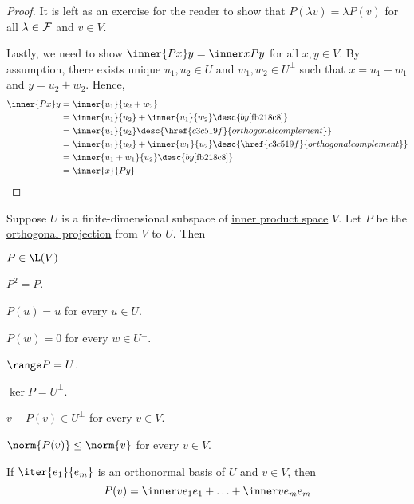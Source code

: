 \begin{proof}
  It is left as an exercise for the reader to show that $P(\lambda v)=\lambda
  P(v)$ for all $\lambda\in\mathcal F$ and $v\in V$.

  Lastly, we need to show $\inner{Px}y=\inner x{Py}$ for all $x,y\in V$. By
  assumption, there exists unique $u_1,u_2\in U$ and $w_1,w_2\in U^\perp$ such
  that $x=u_1+w_1$ and $y=u_2+w_2$. Hence,
  \begin{align*}
    \inner{Px}y &=\inner{u_1}{u_2+w_2}                                                          \\
                &=\inner{u_1}{u_2}+\inner{u_1}{w_2}\desc{by \autoref{fb218c8}}                  \\
                &=\inner{u_1}{u_2}\desc{\href{c3c519f}{orthogonal complement}}                  \\
                &=\inner{u_1}{u_2}+\inner{w_1}{u_2}\desc{\href{c3c519f}{orthogonal complement}} \\
                &=\inner{u_1+w_1}{u_2}\desc{by \autoref{fb218c8}}                               \\
                &=\inner{x}{Py}
  \end{align*}
\end{proof}

\label{f012eec}

Suppose $U$ is a finite-dimensional subspace of \href{b9935c8}{inner product
space} $V$. Let $P$ be the \href{dbfa2fa}{orthogonal projection} from $V$ to
$U$. Then

\begin{enumerata}
  \item $P\in\L(V)$
  \item $P^2=P$.
  \item $P(u)=u$ for every $u\in U$.
  \item $P(w)=0$ for every $w\in U^\perp$.
  \item $\range P=U$.
  \item $\ker P=U^\perp$.
  \item $v-P(v)\in U^\perp$ for every $v\in V$.
  \item $\norm{P(v)}\leq\norm{v}$ for every $v\in V$.
  \item If $\iter{e_1}{e_m}$ is an orthonormal basis of $U$ and $v\in V$, then
  $$
    P(v)=\inner v{e_1}e_1+\ldots+\inner v{e_m}e_m
  $$
\end{enumerata}

